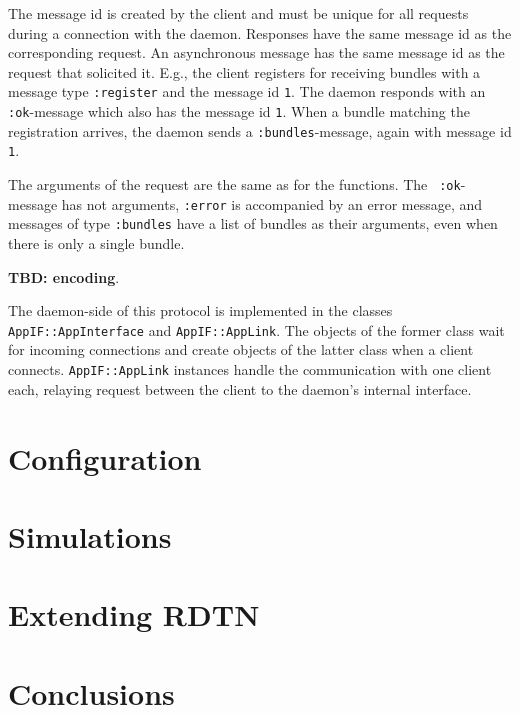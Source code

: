 \documentclass{article}
\begin{document}
The message id is created by the client and must be unique for all requests
during a connection with the daemon. Responses have the same message id as the
corresponding request. An asynchronous message has the same message id as the
request that solicited it. E.g., the client registers for receiving bundles with
a message type {\tt :register} and the message id {\tt 1}. The daemon responds
with an {\tt :ok}-message which also has the message id {\tt 1}. When a bundle
matching the registration arrives, the daemon sends a {\tt :bundles}-message,
again with message id {\tt 1}.

The arguments of the request are the same as for the functions. The {\tt
:ok}-message has not arguments, {\tt :error} is accompanied by an error message,
and messages of type {\tt :bundles} have a list of bundles as their arguments,
even when there is only a single bundle.

{\bf TBD: encoding}.

The daemon-side of this protocol is implemented in the classes {\tt
AppIF::AppInterface} and {\tt AppIF::AppLink}. The objects of the former class
wait for incoming connections and create objects of the latter class when a
client connects. {\tt AppIF::AppLink} instances handle the communication with
one client each, relaying request between the client to the daemon's internal
interface.

\section{Configuration}\label{sec.config}

\section{Simulations}\label{sec.sim}

\section{Extending RDTN}\label{sec.extending}

\section{Conclusions}\label{sec.conclusions}

%
\end{document}
